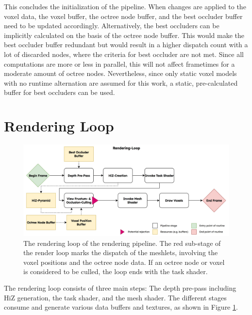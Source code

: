 
\noindent
This concludes the initialization of the pipeline. When changes are applied to the voxel data, the voxel buffer,
the octree node buffer, and the best occluder buffer need to be updated accordingly. Alternatively, the best 
occluders can be implicitly calculated on the basis of the octree node buffer. This would make the best 
occluder buffer redundant but would result in a higher dispatch count with a lot of discarded nodes, 
where the criteria for best occluder are not met. Since all computations are more or less in parallel, this 
will not affect frametimes for a moderate amount of octree nodes. Nevertheless, since only static voxel models with 
no runtime alternation are assumed for this work, a static, pre-calculated buffer for best occluders can be used.


\section{Rendering Loop} \label{sec-rendering-loop}

\begin{figure}[h]
    \centering
    \includegraphics[width=\linewidth]{images/graphics/rendering-loop.jpg}
    \caption{The rendering loop of the rendering pipeline. The red sub-stage of the render loop marks the dispatch 
    of the meshlets, involving the voxel positions and the octree node data. If an octree node or voxel is considered 
    to be culled, the loop ends with the task shader.}
    \label{fig:pipeline-loop}
\end{figure}

\noindent
The rendering loop consists of three main steps: The depth pre-pass including \ac{HiZ} generation, the 
task shader, and the mesh shader. The different stages consume and generate various data buffers 
and textures, as shown in Figure \ref{fig:pipeline-loop}. 

